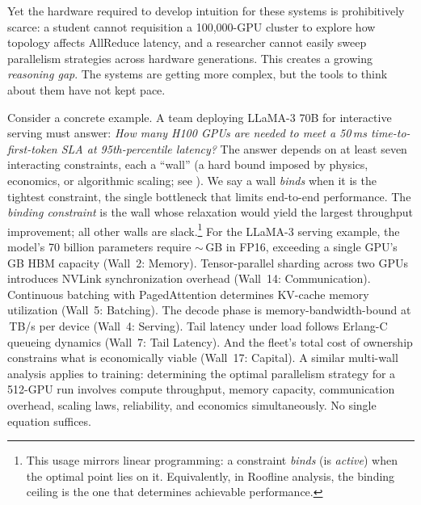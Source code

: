 \documentclass[10pt,twocolumn]{article}
\newcommand{\cvalii}[1]{\pgfmathprintnumber[fixed, precision=2, 1000 sep={\,}]{#1}}
\newcommand{\cvalint}[1]{\pgfmathprintnumber[fixed, precision=0, 1000 sep={\,}]{#1}}
\begin{document}
Yet the hardware required to develop intuition for these systems is prohibitively scarce: a student cannot requisition a 100{,}000-GPU cluster to explore how topology affects AllReduce latency, and a researcher cannot easily sweep parallelism strategies across hardware generations. This creates a growing \emph{reasoning gap}. The systems are getting more complex, but the tools to think about them have not kept pace.

Consider a concrete example. A team deploying LLaMA-3 70B for interactive serving must answer: \emph{How many H100 GPUs are needed to meet a 50\,ms time-to-first-token SLA at 95th-percentile latency?} The answer depends on at least seven interacting constraints, each a ``wall'' (a hard bound imposed by physics, economics, or algorithmic scaling; see ).  We say a wall \emph{binds} when it is the tightest constraint, the single bottleneck that limits end-to-end performance.  The \emph{binding constraint} is the wall whose relaxation would yield the largest throughput improvement; all other walls are slack.\footnote{This usage mirrors linear programming: a constraint \emph{binds} (is \emph{active}) when the optimal point lies on it.  Equivalently, in Roofline analysis, the binding ceiling is the one that determines achievable performance.}  For the LLaMA-3 serving example, the model's 70 billion parameters require $\sim$\cvalint{\LLaMAWeightsGB}\,GB in FP16, exceeding a single GPU's \cvalint{\HhHBMGB}\,GB HBM capacity (Wall~2: Memory). Tensor-parallel sharding across two GPUs introduces NVLink synchronization overhead (Wall~14: Communication). Continuous batching with PagedAttention determines KV-cache memory utilization (Wall~5: Batching). The decode phase is memory-bandwidth-bound at \cvalii{\HhBWTBs}\,TB/s per device (Wall~4: Serving). Tail latency under load follows Erlang-C queueing dynamics (Wall~7: Tail Latency). And the fleet's total cost of ownership constrains what is economically viable (Wall~17: Capital). A similar multi-wall analysis applies to training: determining the optimal parallelism strategy for a 512-GPU run involves compute throughput, memory capacity, communication overhead, scaling laws, reliability, and economics simultaneously. No single equation suffices.
\end{document}
